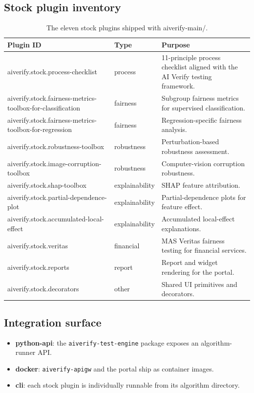 \documentclass[11pt,a4paper,twoside]{report}
\newcommand{\tool}{}
\begin{document}
\subsection*{Stock plugin inventory}

\begin{table}[h]
\centering
\small
\begin{tabularx}{\textwidth}{p{5.4cm}p{2.4cm}X}
\toprule
\textbf{Plugin ID} & \textbf{Type} & \textbf{Purpose} \\
\midrule
aiverify.stock.process-checklist & process &
11-principle process checklist aligned with the AI Verify testing framework. \\
aiverify.stock.fairness-metrics-toolbox-for-classification & fairness &
Subgroup fairness metrics for supervised classification. \\
aiverify.stock.fairness-metrics-toolbox-for-regression & fairness &
Regression-specific fairness analysis. \\
aiverify.stock.robustness-toolbox & robustness &
Perturbation-based robustness assessment. \\
aiverify.stock.image-corruption-toolbox & robustness &
Computer-vision corruption robustness. \\
aiverify.stock.shap-toolbox & explainability &
SHAP feature attribution. \\
aiverify.stock.partial-dependence-plot & explainability &
Partial-dependence plots for feature effect. \\
aiverify.stock.accumulated-local-effect & explainability &
Accumulated local-effect explanations. \\
aiverify.stock.veritas & financial &
MAS Veritas fairness testing for financial services. \\
aiverify.stock.reports & report &
Report and widget rendering for the portal. \\
aiverify.stock.decorators & other &
Shared UI primitives and decorators. \\
\bottomrule
\end{tabularx}
\caption{The eleven stock plugins shipped with \tool{aiverify-main/}.}
\label{tab:av-plugins}
\end{table}

\subsection*{Integration surface}

\begin{itemize}
\item \textbf{python-api}: the \texttt{aiverify-test-engine} package
exposes an algorithm-runner API.
\item \textbf{docker}: \texttt{aiverify-apigw} and the portal ship as
container images.
\item \textbf{cli}: each stock plugin is individually runnable from
its algorithm directory.
\end{itemize}
\end{document}
